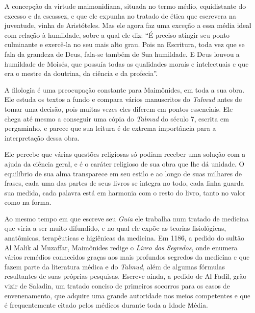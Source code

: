 A concepção da virtude maimonidiana, situada no termo médio,
equidistante do excesso e da escassez, e que ele expunha no tratado de
ética que escrevera na juventude, vinha de Aristóteles. Mas ele agora
faz uma exceção a essa média ideal com relação à humildade, sobre a qual
ele diz: ``É preciso atingir seu ponto culminante e exercê-la no seu
mais alto grau. Pois na Escritura, toda vez que se fala da grandeza de
Deus, fala-se também de Sua humildade. E Deus louvou a humildade de
Moisés, que possuía todas as qualidades morais e intelectuais e que era
o mestre da doutrina, da ciência e da profecia''.

A filologia é uma preocupação constante para Maimônides, em toda a sua
obra. Ele estuda os textos a fundo e compara vários manuscritos do
\emph{Talmud} antes de tomar uma decisão, pois muitas vezes eles diferem
em pontos essenciais. Ele chega até mesmo a conseguir uma cópia do
\emph{Talmud} do século 7, escrita em pergaminho, e parece que sua
leitura é de extrema importância para a interpretação dessa obra.

Ele percebe que várias questões religiosas só podiam receber uma solução
com a ajuda da ciência geral, e é o caráter religioso de sua obra que
lhe dá unidade. O equilíbrio de sua alma transparece em seu estilo e ao
longo de suas milhares de frases, cada uma das partes de seus livros se
integra no todo, cada linha guarda sua medida, cada palavra está em
harmonia com o resto do livro, tanto no valor como na forma.

Ao mesmo tempo em que escreve seu \emph{Guia} ele trabalha num tratado
de medicina que viria a ser muito difundido, e no qual ele expõe as
teorias fisiológicas, anatômicas, terapêuticas e higiênicas da medicina.
Em 1186, a pedido do sultão Al Malik al Muzaffar, Maimônides redige o
\emph{Livro dos Segredos}, onde enumera vários remédios conhecidos
graças aos mais profundos segredos da medicina e que fazem parte da
literatura médica e do \emph{Talmud}, além de algumas fórmulas
resultantes de suas próprias pesquisas. Escreve ainda, a pedido de Al
Fadil, grão-vizir de Saladin, um tratado conciso de primeiros socorros
para os casos de envenenamento, que adquire uma grande autoridade nos
meios competentes e que é frequentemente citado pelos médicos durante
toda a Idade Média.

